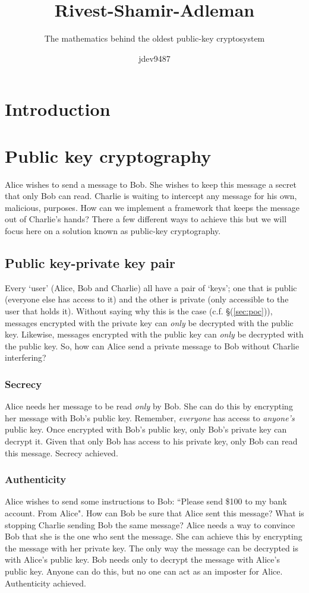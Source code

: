 \documentclass[]{scrartcl}
\author{jdev9487}
\title{Rivest-Shamir-Adleman}
\subtitle{The mathematics behind the oldest public-key cryptosystem}
\theoremstyle{definition}
\renewcommand{\sec}[1]{\S \ref{#1}}
\let\oldref\ref
\renewcommand{\ref}[1]{(\oldref{#1})}
\begin{document}
\maketitle

\tableofcontents
\pagebreak

\section{Introduction}

\section{Public key cryptography}\label{sec:pkc}
Alice wishes to send a message to Bob. She wishes to keep this message a secret that only Bob can read. Charlie is waiting to intercept any message for his own, malicious, purposes. How can we implement a framework that keeps the message out of Charlie's hands? There a few different ways to achieve this but we will focus here on a solution known as public-key cryptography.
\subsection{Public key-private key pair}
Every `user' (Alice, Bob and Charlie) all have a pair of `keys'; one that is public (everyone else has access to it) and the other is private (only accessible to the user that holds it). Without saying why this is the case (c.f. \sec{sec:poc}), messages encrypted with the private key can \textit{only} be decrypted with the public key. Likewise, messages encrypted with the public key can \textit{only} be decrypted with the public key. So, how can Alice send a private message to Bob without Charlie interfering?
\subsubsection{Secrecy}
Alice needs her message to be read \textit{only} by Bob. She can do this by encrypting her message with Bob's public key. Remember, \textit{everyone} has access to \textit{anyone's} public key. Once encrypted with Bob's public key, only Bob's private key can decrypt it. Given that only Bob has access to his private key, only Bob can read this message. Secrecy achieved.
\subsubsection{Authenticity}
Alice wishes to send some instructions to Bob: ``Please send \$100 to my bank account. From Alice". How can Bob be sure that Alice sent this message? What is stopping Charlie sending Bob the same message? Alice needs a way to convince Bob that she is the one who sent the message. She can achieve this by encrypting the message with her private key. The only way the message can be decrypted is with Alice's public key. Bob needs only to decrypt the message with Alice's public key. Anyone can do this, but no one can act as an imposter for Alice. Authenticity achieved.
\end{document}
